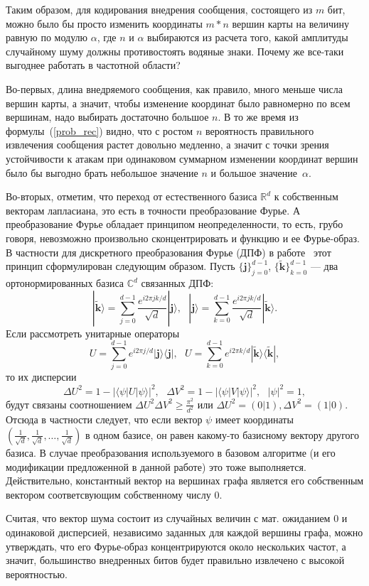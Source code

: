 Таким образом, для кодирования внедрения сообщения, состоящего из $m$ бит, можно было бы просто изменить координаты $m * n$ вершин карты на величину равную по модулю $\alpha$, где
$n$ и $\alpha$ выбираются из расчета того, какой амплитуды случайному шуму должны противостоять водяные знаки. Почему же все-таки выгоднее работать в частотной области?

Во-первых, длина внедряемого сообщения, как правило, много меньше числа вершин карты, а значит, чтобы изменение координат было равномерно 
по всем вершинам, надо выбирать достаточно большое $n$. В то же время из формулы~(\ref{prob_rec}) видно, что с ростом $n$ вероятность 
правильного извлечения сообщения растет довольно медленно, а значит с точки зрения устойчивости к атакам при одинаковом 
суммарном изменении координат вершин было бы выгодно брать небольшое значение $n$ и большое значение~$\alpha$.

Во-вторых, отметим, что переход от естественного базиса $\mathbb{R}^d$ к собственным векторам лапласиана, это есть в точности преобразование Фурье. 
А преобразование Фурье обладает принципом неопределенности, то есть, грубо говоря, невозможно произвольно сконцентрировать и функцию и ее Фурье-образ.
В частности для дискретного преобразования Фурье (ДПФ) в работе~\cite{Uncertainty} этот принцип сформулирован следующим образом. 
Пусть $\{\mathbf{j}\}_{j=0}^{d-1}$, $\{\tilde{\mathbf{k}}\}_{k=0}^{d-1}$ --- два ортонормированных базиса $\mathbb{C}^d$ связанных ДПФ:
\begin{equation*}
\textstyle |\tilde{\mathbf{k}} \rangle = \sum\limits_{j=0}^{d-1} \frac{e^{i 2\pi j k / d}}{\sqrt{d}} |\mathbf{j} \rangle,\mbox{    }
|{\mathbf{j}} \rangle = \sum\limits_{k=0}^{d-1} \frac{e^{i 2\pi j k / d}}{\sqrt{d}} |\tilde{\mathbf{k}} \rangle.
\end{equation*}
Если рассмотреть унитарные операторы 
$$
U = \sum\limits_{j=0}^{d-1} e^{i 2\pi j / d} |\mathbf{j} \rangle \langle \mathbf{j} |,\mbox{    }
U = \sum\limits_{k=0}^{d-1} e^{i 2\pi k / d} |\tilde{\mathbf{k}} \rangle \langle \tilde{\mathbf{k}} |,
$$
то их дисперсии
$$
\textstyle
\Delta U^2 = 1 - |\langle \psi | U | \psi \rangle |^2, \mbox{   }
\Delta V^2 = 1 - |\langle \psi | V | \psi \rangle |^2, \mbox{   } |\psi|^2 = 1,
$$
будут связаны соотношением $\Delta U^2 \Delta V^2 \ge \frac{\pi^2}{d^2}$ или $\Delta U^2 = (0|1), \Delta V^2 = (1|0)$. 
Отсюда в частности следует, что если вектор $\psi$ имеет координаты 
$\left(\frac{1}{\sqrt{d}}, \frac{1}{\sqrt{d}}, \ldots, \frac{1}{\sqrt{d}}\right)$ в одном базисе, он равен какому-то базисному вектору другого базиса.
В случае преобразования используемого в базовом алгоритме (и его модификации предложенной в данной работе) это тоже выполняется. 
Действительно, константный вектор на вершинах графа является его собственным вектором соответсвующим собственному числу $0$.

Считая, что вектор шума состоит из случайных величин с мат. ожиданием $0$ и одинаковой дисперсией, независимо заданных для каждой вершины графа, 
можно утверждать, что его Фурье-образ концентрируются около нескольких частот, а значит, большинство внедренных битов будет правильно извлечено
с высокой вероятностью.
